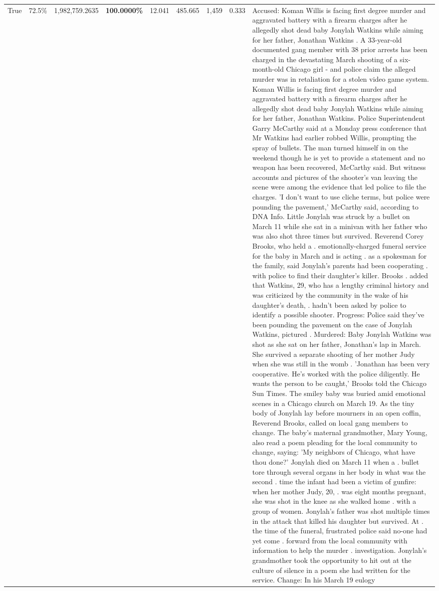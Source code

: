 \begin{table}[H]
\begin{tabular}{lllrlllll}
True & 72.5\% & 1,982,759.2635 & \bfseries \color{red} 100.0000\% & 12.041 & 485.665 & 1,459 & 0.333 & Accused: Koman Willis is facing first degree murder and aggravated battery with a firearm charges after he allegedly shot dead baby Jonylah Watkins while aiming for her father, Jonathan Watkins . A 33-year-old documented gang member with 38 prior arrests has been charged in the devastating March shooting of a six-month-old Chicago girl - and police claim the alleged murder was in retaliation for a stolen video game system. Koman Willis is facing first degree murder and aggravated battery with a firearm charges after he allegedly shot dead baby Jonylah Watkins while aiming for her father, Jonathan Watkins. Police Superintendent Garry McCarthy said at a Monday press conference that Mr Watkins had earlier robbed Willis, prompting the spray of bullets. The man turned himself in on the weekend though he is yet to provide a statement and no weapon has been recovered, McCarthy said. But witness accounts and pictures of the shooter's van leaving the scene were among the evidence that led police to file the charges. 'I don't want to use cliche terms, but police were pounding the pavement,' McCarthy said, according to DNA Info. Little Jonylah was struck by a bullet on March 11 while she sat in a minivan with her father who was also shot three times but survived. Reverend Corey Brooks, who held a . emotionally-charged funeral service for the baby in March and is acting . as a spokesman for the family, said Jonylah's parents had been cooperating . with police to find their daughter's killer. Brooks . added that Watkins, 29, who has a lengthy criminal history and was criticized by the community in the wake of his daughter's death, . hadn't been asked by police to identify a possible shooter. Progress: Police said they've been pounding the pavement on the case of Jonylah Watkins, pictured . Murdered: Baby Jonylah Watkins was shot as she sat on her father, Jonathan's lap in March. She survived a separate shooting of her mother Judy when she was still in the womb . 'Jonathan has been very cooperative. He's worked with the police diligently. He wants the person to be caught,' Brooks told the Chicago Sun Times. The smiley baby was buried amid emotional scenes in a Chicago church on March 19. As the tiny body of Jonylah lay before mourners in an open coffin, Reverend Brooks, called on local gang members to change. The baby's maternal grandmother, Mary Young, also read a poem pleading for the local community to change, saying: 'My neighbors of Chicago, what have thou done?' Jonylah died on March 11 when a . bullet tore through several organs in her body in what was the second . time the infant had been a victim of gunfire: when her mother Judy, 20, . was eight months pregnant, she was shot in the knee as she walked home . with a group of women. Jonylah's father was shot multiple times in the attack that killed his daughter but survived. At . the time of the funeral, frustrated police said no-one had yet come . forward from the local community with information to help the murder . investigation. Jonylah's grandmother took the opportunity to hit out at the culture of silence in a poem she had written for the service. Change: In his March 19 eulogy 
\end{tabular}
\end{table}
